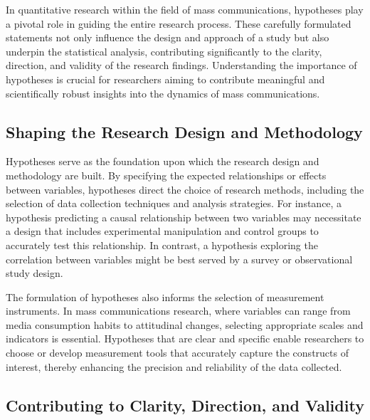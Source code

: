 \documentclass[
]{book}
\begin{document}
In quantitative research within the field of mass communications, hypotheses play a pivotal role in guiding the entire research process. These carefully formulated statements not only influence the design and approach of a study but also underpin the statistical analysis, contributing significantly to the clarity, direction, and validity of the research findings. Understanding the importance of hypotheses is crucial for researchers aiming to contribute meaningful and scientifically robust insights into the dynamics of mass communications.

\hypertarget{shaping-the-research-design-and-methodology}{%
\subsection*{Shaping the Research Design and Methodology}\label{shaping-the-research-design-and-methodology}}

Hypotheses serve as the foundation upon which the research design and methodology are built. By specifying the expected relationships or effects between variables, hypotheses direct the choice of research methods, including the selection of data collection techniques and analysis strategies. For instance, a hypothesis predicting a causal relationship between two variables may necessitate a design that includes experimental manipulation and control groups to accurately test this relationship. In contrast, a hypothesis exploring the correlation between variables might be best served by a survey or observational study design.

The formulation of hypotheses also informs the selection of measurement instruments. In mass communications research, where variables can range from media consumption habits to attitudinal changes, selecting appropriate scales and indicators is essential. Hypotheses that are clear and specific enable researchers to choose or develop measurement tools that accurately capture the constructs of interest, thereby enhancing the precision and reliability of the data collected.

\hypertarget{contributing-to-clarity-direction-and-validity}{%
\subsection*{Contributing to Clarity, Direction, and Validity}\label{contributing-to-clarity-direction-and-validity}}
\end{document}
